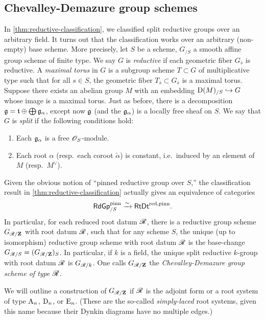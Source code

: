 \subsection{Chevalley-Demazure group schemes}

In \autoref{thm:reductive-classification}, we classified split reductive 
groups over an arbitrary field. It turns out that the classification works over 
an arbitrary (non-empty) base scheme. More precisely, let $S$ be a scheme, 
$G_{/S}$ a smooth affine group scheme of finite type. We say $G$ is 
\emph{reductive} if each geometric fiber $G_{\bar s}$ is reductive. A 
\emph{maximal torus} in $G$ is a subgroup scheme $T\subset G$ of multiplicative 
type such that for all $s\in S$, the geometric fiber 
$T_{\bar s}\subset G_{\bar s}$ is a maximal torus. Suppose there exists an 
abelian group $M$ with an embedding $\operatorname{D}(M)_{/S}\hookrightarrow G$ whose image is a 
maximal torus. Just as before, there is a decomposition 
$\mathfrak{g}=\mathfrak{t}\oplus \bigoplus \mathfrak{g}_\alpha$, except now $\mathfrak{g}$ (and the $\mathfrak{g}_\alpha$) 
is a locally free sheaf on $S$. We say that $G$ is \emph{split} if the 
following conditions hold: 
\begin{enumerate}
  \item Each $\mathfrak{g}_\alpha$ is a free $\mathscr{O}_S$-module. 
  \item Each root $\alpha$ (resp.~each coroot $\check\alpha$) is constant, 
    i.e.~induced by an element of $M$ (resp.~$M^\vee$). 
\end{enumerate}
Given the obvious notion of 
``pinned reductive group over $S$,'' the classification result in 
\autoref{thm:reductive-classification} actually gives an equivalence of 
categories 
\[
  \mathsf{RdGp}_{/S}^\mathrm{pinn} \xrightarrow\sim \mathsf{RtDt}^\mathrm{red,pinn} .
\]
In particular, for each reduced root datum $\mathscr{R}$, there is a reductive group 
scheme $G_{\mathscr{R}/\mathbf{Z}}$ with root datum $\mathscr{R}$, such that for any scheme $S$, the 
unique (up to isomorphism) reductive group scheme with root datum $\mathscr{R}$ is the 
base-change $G_{\mathscr{R}/S} = (G_{\mathscr{R}/\mathbf{Z}})_S$. In particular, if $k$ is a field, 
the unique split reductive $k$-group with root datum $\mathscr{R}$ is 
$G_{\mathscr{R}/k}$. One calls $G_{\mathscr{R}/\mathbf{Z}}$ the \emph{Chevalley-Demazure group scheme 
of type $\mathscr{R}$}. 

We will outline a construction of $G_{\mathscr{R}/\mathbf{Z}}$ if $\mathscr{R}$ is the adjoint 
form or a root system of type $\mathrm{A}_n$, $\mathrm{D}_n$, or $\mathrm{E}_n$. (These 
are the so-called \emph{simply-laced} root systems, given this name because 
their Dynkin diagrams have no multiple edges.)

